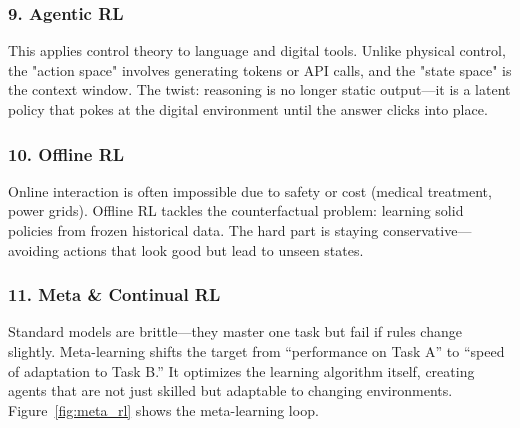\documentclass[12pt,a4paper]{report}
\theoremstyle{definition}
\begin{document}
\subsubsection*{9. Agentic RL}
This applies control theory to language and digital tools. Unlike physical control, the "action space" involves generating tokens or API calls, and the "state space" is the context window. The twist: reasoning is no longer static output---it is a latent policy that pokes at the digital environment until the answer clicks into place.

\subsubsection*{10. Offline RL}
Online interaction is often impossible due to safety or cost (medical treatment, power grids). Offline RL tackles the counterfactual problem: learning solid policies from frozen historical data. The hard part is staying conservative---avoiding actions that look good but lead to unseen states.

\subsubsection*{11. Meta \& Continual RL}
Standard models are brittle---they master one task but fail if rules change slightly. Meta-learning shifts the target from ``performance on Task A'' to ``speed of adaptation to Task B.'' It optimizes the learning algorithm itself, creating agents that are not just skilled but adaptable to changing environments. Figure~\ref{fig:meta_rl} shows the meta-learning loop.
\end{document}
